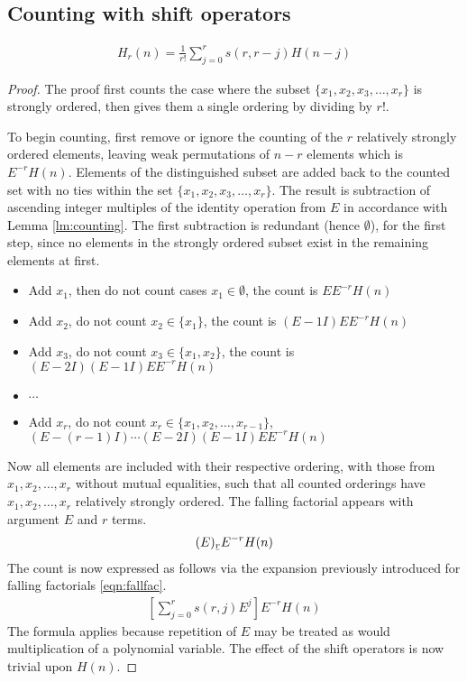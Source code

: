 \documentclass[12pt,reqno]{article}
\newcommand{\ubar}[1]{\text{\b{$#1$}}}
\begin{document}
\subsection{Counting with shift operators}
\begin{theorem}\label{thm:fubinir}

	\begin{align}
		H_{r}(n) = \frac{1}{r!} \sum_{j=0}^{r} s(r,r-j) H(n - j)
	\end{align}

	\begin{proof}
		The proof first counts the case where the subset $\{x_{1}, x_{2}, x_{3}, \ldots, x_{r}\}$ is strongly ordered, then gives them a single ordering by dividing by $r!$.

		To begin counting, first remove or ignore the counting of the $r$ relatively strongly ordered elements, leaving weak permutations of $n - r$ elements which is $E^{- r}H(n)$. Elements of the distinguished subset are added back to the counted set with no ties within the set $\{x_{1}, x_{2}, x_{3}, \ldots, x_{r}\}$. The result is subtraction of ascending integer multiples of the identity operation from $E$ in accordance with Lemma \ref{lm:counting}. The first subtraction is redundant (hence $\emptyset$), for the first step, since no elements in the strongly ordered subset exist in the remaining elements at first.

		\begin{itemize}
			\item{Add $x_{1}$, then do not count cases $x_{1} \in \emptyset$, the count is $EE^{-r}H(n)$}
			\item{Add $x_{2}$, do not count $x_{2} \in\{x_{1}\}$, the count is $(E - 1I)EE^{- r}H(n)$ }
			\item{Add $x_{3}$, do not count $x_{3} \in \{x_{1}, x_{2}\}$,  the count is $(E - 2I)(E - 1I)EE^{-r}H(n)$ }
			\item{$\cdots$}
			\item{Add $x_{r}$, do not count $x_{r} \in \{x_{1}, x_{2}, \ldots ,x_{r - 1}\}$, $(E - (r - 1)I)\cdots(E - 2I)(E - 1I)EE^{-r}H(n)$}
		\end{itemize}
		Now all elements are included with their respective ordering, with those from $x_{1}, x_{2}, \ldots, x_{r}$ without mutual equalities, such that all counted orderings have $x_{1}, x_{2}, \ldots, x_{r}$ relatively strongly ordered. The falling factorial appears with argument $E$ and $r$ terms.
		\begin{align}
			(E)_{\ubar{r}} E^{-r} H(n)
		\end{align}
		The count is now expressed as follows via the expansion previously introduced for falling factorials \eqref{eqn:fallfac}.
		\begin{align}
			 \left[ \sum_{j = 0}^{r} s(r,j)E^{j} \right] E^{-r} H(n)
		\end{align}
		The formula applies because repetition of $E$ may be treated as would multiplication of a polynomial variable. The effect of the shift operators is now trivial upon $H(n)$.


\end{proof}
\end{theorem}
\end{document}
